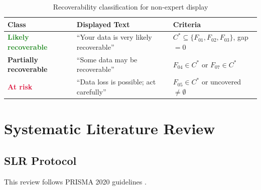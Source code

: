 \documentclass[11pt,a4paper]{report}
\begin{document}
\begin{table}[htbp]
\centering
\caption{Recoverability classification for non-expert display}
\label{tab:recoverability}
\begin{tabular}{@{}lll@{}}
\toprule
\textbf{Class} & \textbf{Displayed Text} & \textbf{Criteria} \\
\midrule
\textcolor{forestgreen}{\textbf{Likely recoverable}} & ``Your data is very likely recoverable'' & $C^* \subseteq \{F_{01}, F_{02}, F_{03}\}$, gap $= 0$ \\
\textcolor{amber}{\textbf{Partially recoverable}} & ``Some data may be recoverable'' & $F_{04} \in C^*$ or $F_{07} \in C^*$ \\
\textcolor{crimson}{\textbf{At risk}} & ``Data loss is possible; act carefully'' & $F_{05} \in C^*$ or uncovered $\neq \emptyset$ \\
\bottomrule
\end{tabular}
\end{table}

\part{Systematic Literature Review}

\chapter{SLR Protocol}

This review follows PRISMA 2020 guidelines \citep{page2021}.
\end{document}
